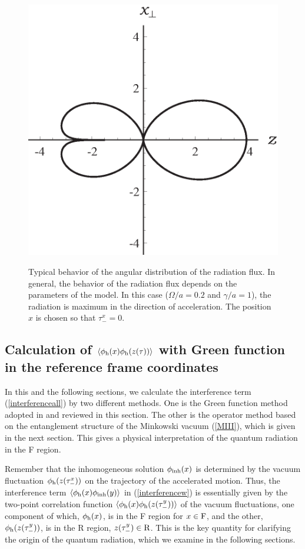 \documentclass[aps,prd,preprintnumbers,nofootinbib,showpacs,11pt]{revtex4}%
\begin{document}
\begin{widetext}
\begin{figure}[t]
\begin{center}
~~~~~~~~~~~~~~~~~
    \includegraphics[width=5.cm]{fig7.eps}
\caption{Typical behavior of the angular distribution of the radiation flux. In general, the behavior 
of the radiation flux depends on the parameters of the model. In this case ($\Omega/a=0.2$ and $\gamma/a=1$), 
the radiation is maximum in the direction of acceleration. The position $x$ is chosen so that $\tau_-^x = 0$. 
\label{fig:funF}}
\end{center}
\end{figure}





\subsection{Calculation of $\langle\phi_{\rm h}(x)\phi_{\rm h}(z(\tau))\rangle$ with 
Green function in the reference frame coordinates 
\label{Sec:InterferenceMink}}
In this and the following sections, we calculate the 
interference term (\ref{interferenceall}) by two different methods.
One is the Green function method adopted in \cite{IYZ,IYZ2013} and reviewed in this section.
The other is the operator method based on the entanglement structure of the 
Minkowski vacuum (\ref{MIII}), which is given in the next section. This gives a physical interpretation
of the quantum radiation in the F region.

Remember that the inhomogeneous solution $\phi_{\rm inh}(x)$ is 
determined by the vacuum fluctuation $\phi_{\rm h}(z(\tau_-^x))$
on the trajectory of the accelerated motion. 
Thus, the interference term $\langle \phi_{\rm h}(x) \phi_{\rm inh}(y)\rangle$ in (\ref{interferencew})
is essentially given by the two-point correlation function  
$\langle \phi_{\rm h}(x) \phi_{\rm h}(z(\tau_-^y))\rangle$
of the vacuum fluctuations, 
one component of which, $\phi_{\rm h}(x)$, is in the F region for $x \in {\rm F}$, and the other, $\phi_{\rm h}(z(\tau_-^y))$,
is in the R region, $z(\tau_-^y) \in {\rm R}$. 
This is the key quantity for clarifying the origin of the quantum radiation, which we examine in the 
following sections.


\end{widetext}
\end{document}
